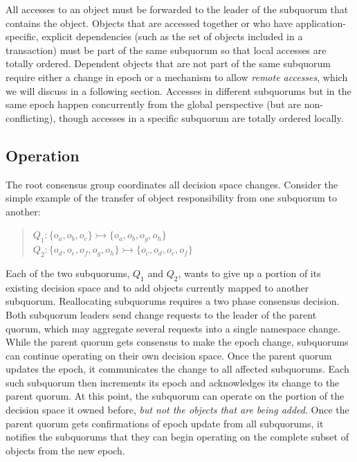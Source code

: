 \documentclass[11pt,letterpaper]{article}
\begin{document}
All accesses to an object must be forwarded to the leader of the subquorum that contains
the object.
Objects that are accessed together or who have application-specific, explicit
dependencies (such as the set of objects included in a transaction) must be part of the
same subquorum so that local accesses are totally ordered.
Dependent objects that are not part of the same subquorum require either a change in
epoch or a mechanism to allow \emph{remote accesses}, which we will discuss in a
following section.
Accesses in different subquorums but in the same epoch happen concurrently
from the global perspective (but are non-conflicting), though accesses in a
specific subquorum are totally ordered locally.

\subsection{Operation}
\vspace{-.5em}

The root consensus group coordinates all decision space changes.
Consider the simple example of the transfer of object responsibility from one subquorum
to another:

\begin{quote}
\small
   $Q_1: \{o_a,o_b,o_c\} \rightarrowtail \{o_a,o_b,o_g,o_h\}$\\
   $Q_2: \{o_d,o_e,o_f,o_g,o_h\} \rightarrowtail \{o_c,o_d,o_e,o_f\}$
\end{quote}

Each of the two subquorums, $Q_1$ and $Q_2$, wants to give up a portion of its
existing decision space and to add objects currently mapped to another subquorum.
Reallocating subquorums requires a two phase consensus decision.
Both subquorum leaders send change requests to the leader of the parent quorum, which may
aggregate several requests into a single namespace change.
While the parent quorum gets consensus to make the epoch change, subquorums can continue
operating on their own decision space.
Once the parent quorum updates the epoch, it communicates the change to all affected
subquorums.
Each such subquorum then increments its epoch and acknowledges its change to the parent
quorum.
At this point, the subquorum can operate on the portion of the decision space it owned
before, \emph{but not the objects that are being added}.
Once the parent quorum gets confirmations of epoch update from all subquorums, it notifies
the subquorums that they can begin operating on the complete subset of objects from the
new epoch.
\end{document}
